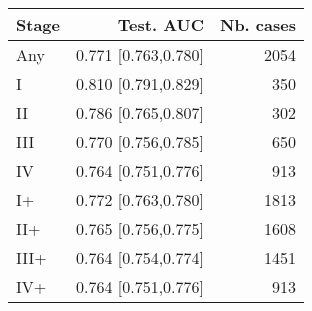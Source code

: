 \begin{table}[ht]
\centering
\begin{tabular}{lrr}
  \toprule
Stage & Test. AUC & Nb. cases \\ 
  \midrule
Any & 0.771 [0.763,0.780] & 2054 \\ 
   \addlinespace
I & 0.810 [0.791,0.829] & 350 \\ 
  II & 0.786 [0.765,0.807] & 302 \\ 
  III & 0.770 [0.756,0.785] & 650 \\ 
  IV & 0.764 [0.751,0.776] & 913 \\ 
   \addlinespace
I+ & 0.772 [0.763,0.780] & 1813 \\ 
  II+ & 0.765 [0.756,0.775] & 1608 \\ 
  III+ & 0.764 [0.754,0.774] & 1451 \\ 
  IV+ & 0.764 [0.751,0.776] & 913 \\ 
   \bottomrule
\end{tabular}
\end{table}
